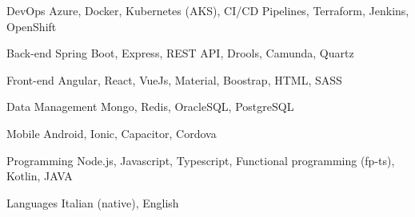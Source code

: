 

\begin{cvskills}

  \cvskill
    {DevOps} %
    {Azure, Docker, Kubernetes (AKS), CI/CD Pipelines, Terraform, Jenkins, OpenShift} %

  \cvskill
    {Back-end} %
    {Spring Boot, Express, REST API, Drools, Camunda, Quartz} %

  \cvskill
    {Front-end} %
    {Angular, React, VueJs, Material, Boostrap, HTML, SASS} %

  \cvskill
    {Data Management} %
    {Mongo, Redis, OracleSQL, PostgreSQL} %

  \cvskill
    {Mobile} %
    {Android, Ionic, Capacitor, Cordova} %

  \cvskill
    {Programming} %
    {Node.js, Javascript, Typescript, Functional programming (fp-ts), Kotlin, JAVA} %

  \cvskill
    {Languages} %
    {Italian (native), English} %

\end{cvskills}
